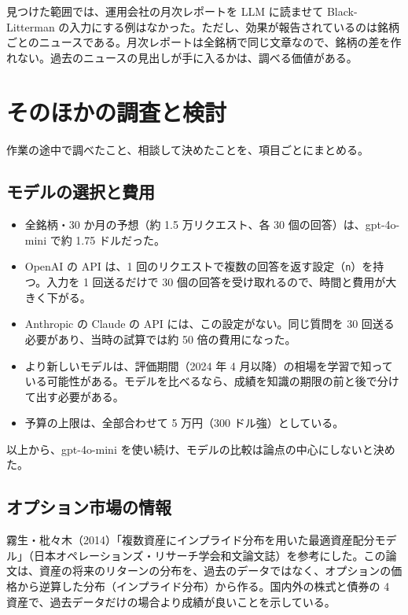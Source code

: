\documentclass[xelatex,ja=standard,jafont=hiragino-pron,a4paper,10pt]{bxjsreport}
\newcommand{\code}[1]{\texttt{#1}}
\begin{document}
見つけた範囲では、運用会社の月次レポートを LLM に読ませて Black-Litterman の入力にする例はなかった。ただし、効果が報告されているのは銘柄ごとのニュースである。月次レポートは全銘柄で同じ文章なので、銘柄の差を作れない。過去のニュースの見出しが手に入るかは、調べる価値がある。

\chapter{そのほかの調査と検討}\label{ch:other}

作業の途中で調べたこと、相談して決めたことを、項目ごとにまとめる。

\section{モデルの選択と費用}

\begin{itemize}
\item 全銘柄・30 か月の予想（約 1.5 万リクエスト、各 30 個の回答）は、gpt-4o-mini で約 1.75 ドルだった。
\item OpenAI の API は、1 回のリクエストで複数の回答を返す設定（\code{n}）を持つ。入力を 1 回送るだけで 30 個の回答を受け取れるので、時間と費用が大きく下がる。
\item Anthropic の Claude の API には、この設定がない。同じ質問を 30 回送る必要があり、当時の試算では約 50 倍の費用になった。
\item より新しいモデルは、評価期間（2024 年 4 月以降）の相場を学習で知っている可能性がある。モデルを比べるなら、成績を知識の期限の前と後で分けて出す必要がある。
\item 予算の上限は、全部合わせて 5 万円（300 ドル強）としている。
\end{itemize}

以上から、gpt-4o-mini を使い続け、モデルの比較は論点の中心にしないと決めた。

\section{オプション市場の情報}

霧生・枇々木（2014）「複数資産にインプライド分布を用いた最適資産配分モデル」（日本オペレーションズ・リサーチ学会和文論文誌）を参考にした。この論文は、資産の将来のリターンの分布を、過去のデータではなく、オプションの価格から逆算した分布（インプライド分布）から作る。国内外の株式と債券の 4 資産で、過去データだけの場合より成績が良いことを示している。
\end{document}
